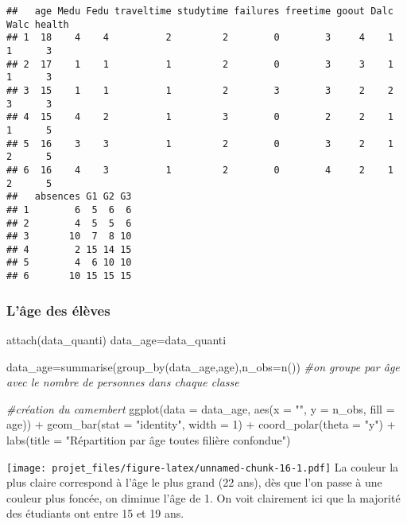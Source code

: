 \documentclass[
]{article}
\newenvironment{Shaded}{\begin{snugshade}}{\end{snugshade}}
\newcommand{\AttributeTok}[1]{\textcolor[rgb]{0.77,0.63,0.00}{#1}}
\newcommand{\CommentTok}[1]{\textcolor[rgb]{0.56,0.35,0.01}{\textit{#1}}}
\newcommand{\DecValTok}[1]{\textcolor[rgb]{0.00,0.00,0.81}{#1}}
\newcommand{\FunctionTok}[1]{\textcolor[rgb]{0.00,0.00,0.00}{#1}}
\newcommand{\NormalTok}[1]{#1}
\newcommand{\OtherTok}[1]{\textcolor[rgb]{0.56,0.35,0.01}{#1}}
\newcommand{\SpecialCharTok}[1]{\textcolor[rgb]{0.00,0.00,0.00}{#1}}
\newcommand{\StringTok}[1]{\textcolor[rgb]{0.31,0.60,0.02}{#1}}
\begin{document}
\begin{verbatim}
##   age Medu Fedu traveltime studytime failures freetime goout Dalc Walc health
## 1  18    4    4          2         2        0        3     4    1    1      3
## 2  17    1    1          1         2        0        3     3    1    1      3
## 3  15    1    1          1         2        3        3     2    2    3      3
## 4  15    4    2          1         3        0        2     2    1    1      5
## 5  16    3    3          1         2        0        3     2    1    2      5
## 6  16    4    3          1         2        0        4     2    1    2      5
##   absences G1 G2 G3
## 1        6  5  6  6
## 2        4  5  5  6
## 3       10  7  8 10
## 4        2 15 14 15
## 5        4  6 10 10
## 6       10 15 15 15
\end{verbatim}

\hypertarget{luxe2ge-des-uxe9luxe8ves}{%
\subsubsection{L'âge des élèves}\label{luxe2ge-des-uxe9luxe8ves}}

\begin{Shaded}
\begin{Highlighting}[]
\FunctionTok{attach}\NormalTok{(data\_quanti)}
\NormalTok{data\_age}\OtherTok{=}\NormalTok{data\_quanti}

\NormalTok{data\_age}\OtherTok{=}\FunctionTok{summarise}\NormalTok{(}\FunctionTok{group\_by}\NormalTok{(data\_age,age),}\AttributeTok{n\_obs=}\FunctionTok{n}\NormalTok{()) }\CommentTok{\#on groupe par âge avec le nombre de personnes dans chaque classe}

\CommentTok{\#création du camembert}
\FunctionTok{ggplot}\NormalTok{(}\AttributeTok{data =}\NormalTok{ data\_age, }\FunctionTok{aes}\NormalTok{(}\AttributeTok{x =} \StringTok{""}\NormalTok{, }\AttributeTok{y =}\NormalTok{ n\_obs, }\AttributeTok{fill =}\NormalTok{ age)) }\SpecialCharTok{+}
  \FunctionTok{geom\_bar}\NormalTok{(}\AttributeTok{stat =} \StringTok{"identity"}\NormalTok{, }\AttributeTok{width =} \DecValTok{1}\NormalTok{) }\SpecialCharTok{+}
  \FunctionTok{coord\_polar}\NormalTok{(}\AttributeTok{theta =} \StringTok{"y"}\NormalTok{) }\SpecialCharTok{+}
  \FunctionTok{labs}\NormalTok{(}\AttributeTok{title =} \StringTok{"Répartition par âge toutes filière confondue"}\NormalTok{)}
\end{Highlighting}
\end{Shaded}

\texttt{[image: projet\_files/figure-latex/unnamed-chunk-16-1.pdf]} La
couleur la plus claire correspond à l'âge le plus grand (22 ans), dès
que l'on passe à une couleur plus foncée, on diminue l'âge de 1. On voit
clairement ici que la majorité des étudiants ont entre 15 et 19 ans.
\end{document}
